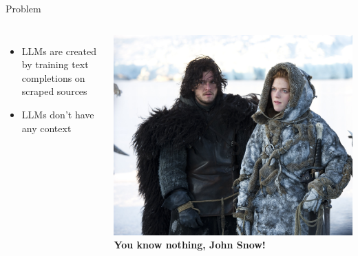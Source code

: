 \documentclass[aspectratio=169]{beamer}
\begin{document}
\begin{frame}[fragile]{Problem}
\begin{columns}
\begin{itemize}
  \item LLMs are created by training text completions on scraped sources
  \item LLMs don't have any context
\end{itemize}
  \includegraphics[width=\linewidth]{JohnSnow}
\textbf{You know nothing, John Snow!} 
\end{columns}
\end{frame}
\end{document}
